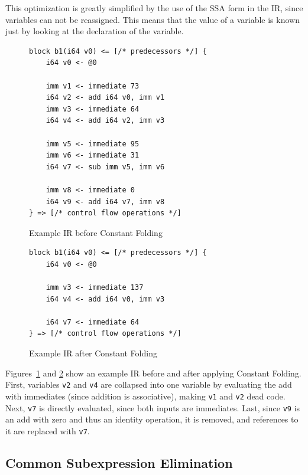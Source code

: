 \documentclass[course=eragp]{aspdoc}
\begin{document}
This optimization is greatly simplified by the use of the SSA form in the IR, since variables can not be
reassigned. This means that the value of a variable is known just by looking at the declaration of the variable.

\begin{figure}[H]
    \centering
    \begin{lstlisting}[]
block b1(i64 v0) <= [/* predecessors */] {
    i64 v0 <- @0

    imm v1 <- immediate 73
    i64 v2 <- add i64 v0, imm v1
    imm v3 <- immediate 64
    i64 v4 <- add i64 v2, imm v3

    imm v5 <- immediate 95
    imm v6 <- immediate 31
    i64 v7 <- sub imm v5, imm v6

    imm v8 <- immediate 0
    i64 v9 <- add i64 v7, imm v8
} => [/* control flow operations */]
\end{lstlisting}
    \caption{Example IR before Constant Folding}\label{fig:const_folding_example_before}
\end{figure}

\begin{figure}[H]
    \centering
    \begin{lstlisting}[]
block b1(i64 v0) <= [/* predecessors */] {
    i64 v0 <- @0

    imm v3 <- immediate 137
    i64 v4 <- add i64 v0, imm v3

    i64 v7 <- immediate 64
} => [/* control flow operations */]
\end{lstlisting}
    \caption{Example IR after Constant Folding}\label{fig:const_folding_example_after}
\end{figure}

Figures~\ref{fig:const_folding_example_before} and \ref{fig:const_folding_example_after} show an example IR before and
after applying Constant Folding. First, variables \texttt{v2} and \texttt{v4} are collapsed into one variable by
evaluating the add with immediates (since addition is associative), making \texttt{v1} and \texttt{v2} dead
code. Next, \texttt{v7} is directly evaluated, since both inputs are immediates. Last, since \texttt{v9} is an add with
zero and thus an identity operation, it is removed, and references to it are replaced with \texttt{v7}.

\subsection{Common Subexpression Elimination}
\end{document}
